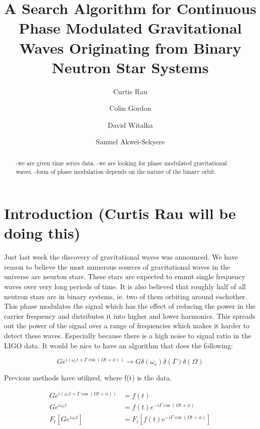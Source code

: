 \documentclass[twocolumn, groupedaddress]{revtex4-1}
\begin{document}
\author{Curtis Rau}
\author{Colin Gordon}
\author{David Witalka}
\author{Samuel Akwei-Sekyere}
\title{A Search Algorithm for Continuous Phase Modulated Gravitational Waves Originating from Binary Neutron Star Systems}

\begin{abstract}
-we are given time series data.
-we are looking for phase modulated gravitational waves.
-form of phase modulation depends on the nature of the binary orbit.
\citep{Saulson}
\citep{LSCall}
\citep{Deanna}
\citep{folland}
\citep{griffiths}
\end{abstract}

\maketitle



\section{Introduction (Curtis Rau will be doing this)}

Just last week the discovery of gravitational waves was announced.  We have reason to believe the most numerous sources of gravitational waves in the universe are neurton stars.  These stars are expected to emmit single frequency waves over very long periods of time.  It is also believed that roughly half of all neutron stars are in binary systems, ie. two of them orbiting around eachother.  This phase modulates the signal which has the effect of reducing the power in the carrier frequency and distributes it into higher and lower harmonics.  This spreads out the power of the signal over a range of frequencies which makes it harder to detect these waves.  Especially because there is a high noise to signal ratio in the LIGO data.  It would be nice to have an algorithm that does the following:

\begin{equation}
G e^{i\left( \omega_c t + \Gamma \cos (\Omega t + \phi ) \right)} \to G \delta (\omega_c) \delta (\Gamma ) \delta (\Omega )
\end{equation}

Previous methods have utilized, where f(t) is the data.

\begin{align}
G e^{i\left( \omega_c t + \Gamma \cos (\Omega t + \phi ) \right)} &= f(t) \\
G e^{i\omega_c t} &= f(t) e^{-i\Gamma \cos (\Omega t + \phi)}			 \\
F_t \left[ G e^{i\omega_c t} \right] &= F_t \left[ f(t) e^{-i\Gamma \cos (\Omega t + \phi)} \right]
\end{align}
\end{document}
